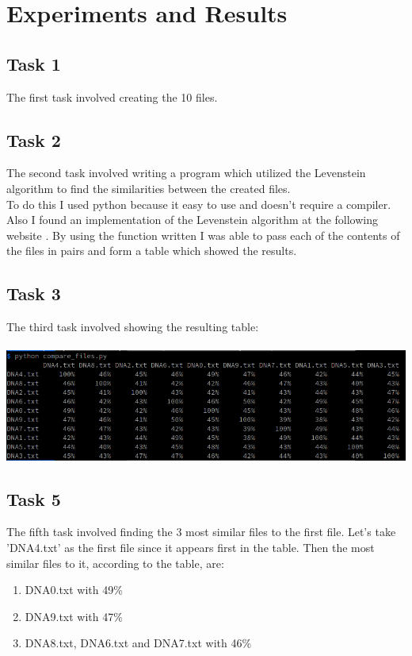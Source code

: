 \documentclass[]{article}
\newcommand\tab[1][1cm]{\hspace*{#1}}
\begin{document}
\section{Experiments and Results}

\subsection{Task 1}
\tab The first task involved creating the 10 files.

\subsection{Task 2}
\tab The second task involved writing a program which utilized the Levenstein
algorithm to find the similarities between the created files.\\
\tab To do this I used python because it easy to use and doesn't require a
compiler. Also I found an implementation of the Levenstein algorithm at the
following website \cite{LevensteinCode}. By using the function written I was able to pass each 
of the contents of the files in pairs and form a table which showed the results.

\subsection{Task 3}
\tab The third task involved showing the resulting table:\\ \\
\includegraphics[scale=0.7]{res/similarities.png}

\subsection{Task 5}
\tab The fifth task involved finding the 3 most similar files to the first file.
Let's take 'DNA4.txt' as the first file since it appears first in the table.
Then the most similar files to it, according to the table, are:
\begin{enumerate}
	\item DNA0.txt with 49\%
	\item DNA9.txt with 47\%
	\item DNA8.txt, DNA6.txt and DNA7.txt with 46\%
\end{enumerate}

{}

\end{document}
